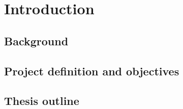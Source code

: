\graphicspath{{introduction/fig/}}

\chapter{Introduction}
\label{chap:introduction}

\section{Background}
\section{Project definition and objectives}
\section{Thesis outline}



